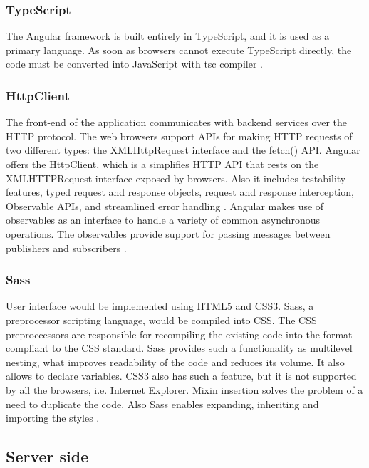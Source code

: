 \subsubsection{TypeScript}
The Angular framework is built entirely in TypeScript, and it is used as a primary 
language. As soon as browsers cannot execute TypeScript directly, the code must be converted into JavaScript with tsc compiler \cite[TypeScript Configuration]{angular}.

\subsubsection{HttpClient}

The front-end of the application communicates with backend services over the HTTP protocol. The web browsers support APIs for making HTTP requests of two different types: the XMLHttpRequest interface and the fetch() API. Angular offers the HttpClient, which is a simplifies HTTP API that rests on the XMLHTTPRequest interface exposed by browsers. Also it includes testability features, typed request and response objects, request and response interception, Observable APIs, and streamlined error handling \cite[HttpClient]{angular}. Angular makes use of observables as an interface to handle a variety of common asynchronous operations. The observables provide support for passing messages between publishers and subscribers \cite[Observables \& RxJS]{angular}. 

\subsubsection{Sass}

User interface would be implemented using HTML5 and CSS3. Sass, a preprocessor scripting language, would be compiled into CSS. The CSS preproccessors are responsible for recompiling the existing code into the format compliant to the CSS standard. Sass provides such a functionality as multilevel nesting, what improves readability of the code and reduces its volume. It also allows to declare variables. CSS3 also has such a feature, but it is not supported by all the browsers, i.e. Internet Explorer. Mixin insertion solves the problem of a need to duplicate the code. Also Sass enables expanding, inheriting and importing the styles \cite{sass}.

\subsection{Server side}

